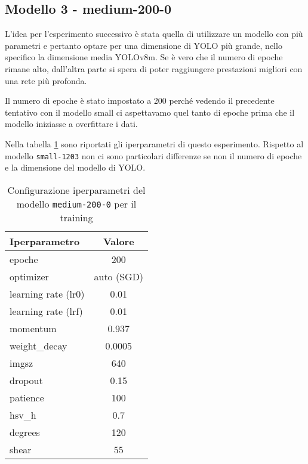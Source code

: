 \subsection*{Modello 3 - medium-200-0}

L'idea per l'esperimento successivo è stata quella di utilizzare un modello con più parametri e
pertanto optare per una dimensione di YOLO più grande, nello specifico la dimensione media YOLOv8m. 
Se è vero che il numero di epoche rimane
alto, dall'altra parte si spera di poter raggiungere prestazioni migliori con una rete più profonda.

Il numero di epoche è stato impostato a 200 perché vedendo il precedente tentativo con il modello small
ci aspettavamo quel tanto di epoche prima che il modello iniziasse a overfittare i dati. 

Nella tabella \ref*{tab:v3-model-configs} sono riportati gli iperparametri di questo esperimento. 
Rispetto al modello \texttt{small-1203} non ci sono particolari differenze se non il numero di epoche e 
la dimensione del modello di YOLO. 

\begin{table}[!htb]
    \centering
    \begin{tabular}{lc}
        \hline
        \textbf{Iperparametro} & \textbf{Valore} \\
        \hline
        epoche & 200  \\
        optimizer & auto (SGD) \\
        learning rate (lr0) & 0.01 \\
        learning rate (lrf) & 0.01 \\
        momentum & 0.937 \\
        weight\_decay & 0.0005 \\
        imgsz & 640 \\
        dropout & 0.15 \\
        patience & 100 \\
        \midrule
        hsv\_h & 0.7 \\
        degrees & 120 \\
        shear & 55 \\
        \hline
    \end{tabular}
    \caption{Configurazione iperparametri del modello \texttt{medium-200-0} per il training}
    \label{tab:v3-model-configs}
    \end{table}

